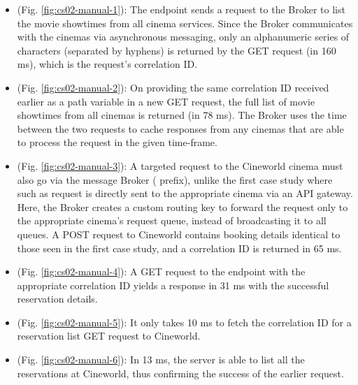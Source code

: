 \begin{itemize}
  \item {} (Fig. \ref{fig:cs02-manual-1}): The  endpoint sends a request to the Broker to list the movie showtimes from all cinema services. Since the Broker communicates with the cinemas via asynchronous messaging, only an alphanumeric series of characters (separated by hyphens) is returned by the GET request (in 160 ms), which is the request's correlation ID.

  \item {} (Fig. \ref{fig:cs02-manual-2}): On providing the same correlation ID received earlier as a path variable in a new GET request, the full list of movie showtimes from all cinemas is returned (in 78 ms). The Broker uses the time between the two requests to cache responses from any cinemas that are able to process the request in the given time-frame.

  \item {} (Fig. \ref{fig:cs02-manual-3}): A targeted request to the Cineworld cinema must also go via the message Broker ( prefix), unlike the first case study where such as request is directly sent to the appropriate cinema via an API gateway. Here, the Broker creates a custom routing key to forward the request only to the appropriate cinema's request queue, instead of broadcasting it to all queues. A POST request to Cineworld contains booking details identical to those seen in the first case study, and a correlation ID is returned in 65 ms.

  \item {} (Fig. \ref{fig:cs02-manual-4}): A GET request to the  endpoint with the appropriate correlation ID yields a response in 31 ms with the successful reservation details.

  \item {} (Fig. \ref{fig:cs02-manual-5}): It only takes 10 ms to fetch the correlation ID for a reservation list GET request to Cineworld.

  \item {} (Fig. \ref{fig:cs02-manual-6}): In 13 ms, the server is able to list all the reservations at Cineworld, thus confirming the success of the earlier  request.
\end{itemize}

